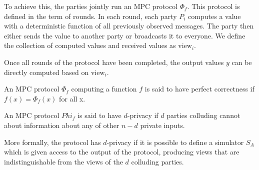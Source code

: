 To achieve this, the parties jointly run an MPC protocol $\Phi_{f}$. This protocol
is defined in the term of rounds.
In each round, each party $P_{i}$ computes a
value with a deterministic function of all previously observed messages.
The party then either sends the value to another party or broadcasts it to everyone.
We define the collection of
computed values and received values as $\text{view}_{i}$.

Once all rounds of the protocol have been completed, the output values $y$ can be
directly computed based on $\text{view}_{i}$.


\begin{definition}
  \label{def:mpc:correctness}
  An MPC protocol $\Phi_{f}$ computing a function $f$ is said to have perfect
  correctness if $f(x) = \Phi_{f}(x)$ for all x.
\end{definition}

\begin{definition}[d-Privacy]
\label{def:mpc:d-privacy}
  An MPC protocol $Phi_{f}$ is said to have $d$-privacy if $d$ parties colluding
  cannot about information about any of other $n-d$ private inputs.

  More formally, the protocol has $d$-privacy if it is possible to define a
  simulator $S_{A}$ which is given access to the output of the protocol,
  producing views that are indistinguishable from the views of the $d$ colluding
  parties.
\end{definition}

